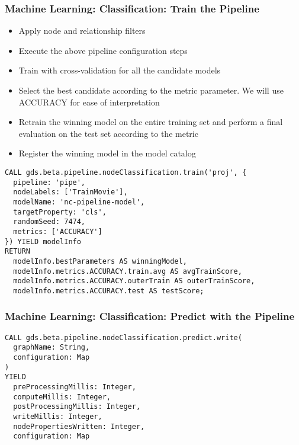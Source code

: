 \begin{frame}[fragile]\frametitle{Machine Learning: Classification: Train the Pipeline}

\begin{itemize}
\item Apply node and relationship filters
\item Execute the above pipeline configuration steps
\item Train with cross-validation for all the candidate models
\item Select the best candidate according to the metric parameter. We will use ACCURACY for ease of interpretation
\item Retrain the winning model on the entire training set and perform a final evaluation on the test set according to the metric
\item Register the winning model in the model catalog

\end{itemize}


\begin{lstlisting}
CALL gds.beta.pipeline.nodeClassification.train('proj', {
  pipeline: 'pipe',
  nodeLabels: ['TrainMovie'],
  modelName: 'nc-pipeline-model',
  targetProperty: 'cls',
  randomSeed: 7474,
  metrics: ['ACCURACY']
}) YIELD modelInfo
RETURN
  modelInfo.bestParameters AS winningModel,
  modelInfo.metrics.ACCURACY.train.avg AS avgTrainScore,
  modelInfo.metrics.ACCURACY.outerTrain AS outerTrainScore,
  modelInfo.metrics.ACCURACY.test AS testScore;
\end{lstlisting}
\end{frame}

\begin{frame}[fragile]\frametitle{Machine Learning: Classification: Predict with the Pipeline}

\begin{lstlisting}
CALL gds.beta.pipeline.nodeClassification.predict.write(
  graphName: String,
  configuration: Map
)
YIELD
  preProcessingMillis: Integer,
  computeMillis: Integer,
  postProcessingMillis: Integer,
  writeMillis: Integer,
  nodePropertiesWritten: Integer,
  configuration: Map
\end{lstlisting}
	
\end{frame}



